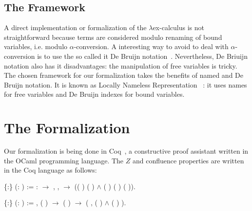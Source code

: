 \documentclass{llncs}
\begin{document}
  \subsection{The Framework}

  A direct implementation or formalization of the $\lambda$ex-calculus
  is not straightforward because terms are considered modulo renaming
  of bound variables, i.e. modulo $\alpha$-conversion. A interesting
  way to avoid to deal with $\alpha$-conversion is to use the so
  called {it De Bruijn}
  notation~\cite{bruijn72:_lambd_churc_rosser}. Nevertheless, De
  Briuijn notation also has it disadvantages: the manipulation of free
  variables is tricky. The chosen framework for our formalization
  takes the benefits of named and De Bruijn notation. It is known as
  Locally Nameless Representation ~\cite{Ch11}: it uses names for free
  variables and De Bruijn indexes for bound variables.

\section{The Formalization}
  
Our formalization is being done in Coq~\cite{CoqTeam}, a constructive
proof assistant written in the OCaml programming language. The
$Z$ and confluence properties are written in the Coq language as follows:

\begin{coqdoccode}
  \coqdocnoindent {}
   \{:\}
  (:  ) :=
  \coqdoctac{\ensuremath{\exists}} :
  \ensuremath{\rightarrow} ,
  \coqdockw{\ensuremath{\forall}}  ,
     \ensuremath{\rightarrow}
  (( ) 
  ( ) \ensuremath{\land}
  ( ) (
  ) ( )).\coqdoceol
\end{coqdoccode}

\begin{coqdoccode}
  \coqdocnoindent{} 
  \{:\} (: 
  ) := \coqdockw{\ensuremath{\forall}} 
   , ( )
    \ensuremath{\rightarrow}
  ( )  
  \ensuremath{\rightarrow} (\coqdoctac{\ensuremath{\exists}}
  , ( ) 
   \ensuremath{\land} (
  )  ).\coqdoceol
\end{coqdoccode}
\end{document}
